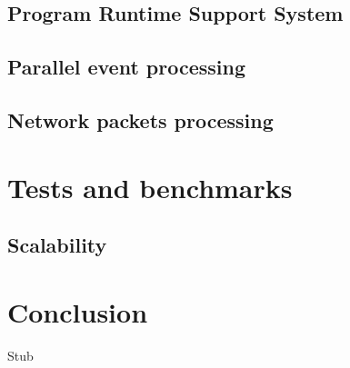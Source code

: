 \documentclass[10pt, conference, compsocconf]{IEEEtran}
\begin{document}
\subsection{Program Runtime Support System}

\subsection{Parallel event processing}

\subsection{Network packets processing}

\section{Tests and benchmarks}

\subsection{Scalability}

\section{Conclusion}


\begin{thebibliography}{99}
Stub
\end{thebibliography}
\end{document}
